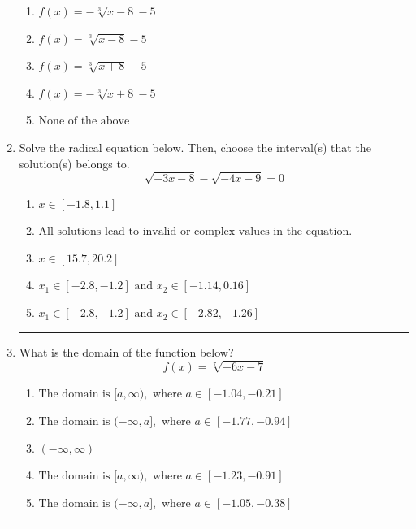 \documentclass[14pt]{extbook}
\newcommand{\litem}[1]{\item#1\hspace*{-1cm}\rule{\textwidth}{0.4pt}}
\begin{document}
\begin{enumerate}
{\begin{center}
\end{center}
\begin{enumerate}[label=\Alph*.]
\item \( f(x) = - \sqrt[3]{x - 8} - 5 \)
\item \( f(x) = \sqrt[3]{x - 8} - 5 \)
\item \( f(x) = \sqrt[3]{x + 8} - 5 \)
\item \( f(x) = - \sqrt[3]{x + 8} - 5 \)
\item \( \text{None of the above} \)

\end{enumerate} }
\litem{
Solve the radical equation below. Then, choose the interval(s) that the solution(s) belongs to.\[ \sqrt{-3 x - 8} - \sqrt{-4 x - 9} = 0 \]\begin{enumerate}[label=\Alph*.]
\item \( x \in [-1.8,1.1] \)
\item \( \text{All solutions lead to invalid or complex values in the equation.} \)
\item \( x \in [15.7,20.2] \)
\item \( x_1 \in [-2.8, -1.2] \text{ and } x_2 \in [-1.14,0.16] \)
\item \( x_1 \in [-2.8, -1.2] \text{ and } x_2 \in [-2.82,-1.26] \)

\end{enumerate} }
\litem{
What is the domain of the function below?\[ f(x) = \sqrt[7]{-6 x - 7} \]\begin{enumerate}[label=\Alph*.]
\item \( \text{The domain is } [a, \infty), \text{   where } a \in [-1.04, -0.21] \)
\item \( \text{The domain is } (-\infty, a], \text{   where } a \in [-1.77, -0.94] \)
\item \( (-\infty, \infty) \)
\item \( \text{The domain is } [a, \infty), \text{   where } a \in [-1.23, -0.91] \)
\item \( \text{The domain is } (-\infty, a], \text{   where } a \in [-1.05, -0.38] \)


\end{enumerate}}
\end{enumerate}
\end{document}
